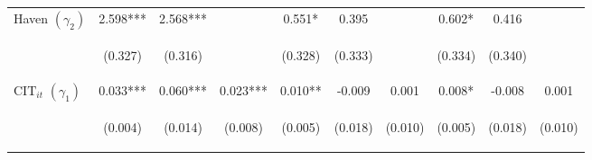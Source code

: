 \begin{center}
\begin{tabular}{lccccccccc}
Haven $(\gamma_2)$ & 2.598*** & 2.568*** &  & 0.551* & 0.395 &  & 0.602* & 0.416 &  \\
\vspace{4pt} & \begin{footnotesize}(0.327)\end{footnotesize} & \begin{footnotesize}(0.316)\end{footnotesize} & \begin{footnotesize}\end{footnotesize} & \begin{footnotesize}(0.328)\end{footnotesize} & \begin{footnotesize}(0.333)\end{footnotesize} & \begin{footnotesize}\end{footnotesize} & \begin{footnotesize}(0.334)\end{footnotesize} & \begin{footnotesize}(0.340)\end{footnotesize} & \begin{footnotesize}\end{footnotesize} \\
$ \text{CIT}_{it}$ $(\gamma_1)$ & 0.033*** & 0.060*** & 0.023*** & 0.010** & -0.009 & 0.001 & 0.008* & -0.008 & 0.001 \\
\vspace{4pt} & \begin{footnotesize}(0.004)\end{footnotesize} & \begin{footnotesize}(0.014)\end{footnotesize} & \begin{footnotesize}(0.008)\end{footnotesize} & \begin{footnotesize}(0.005)\end{footnotesize} & \begin{footnotesize}(0.018)\end{footnotesize} & \begin{footnotesize}(0.010)\end{footnotesize} & \begin{footnotesize}(0.005)\end{footnotesize} & \begin{footnotesize}(0.018)\end{footnotesize} & \begin{footnotesize}(0.010)\end{footnotesize} \\

\end{tabular}
\end{center}
